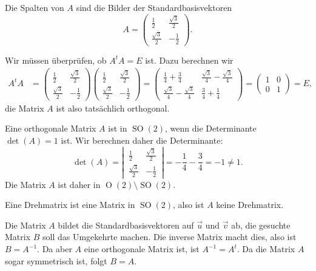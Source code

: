 \begin{loesung}
\begin{teilaufgaben}
\item Die Spalten von $A$ sind die Bilder der Standardbasisvektoren
\[
A=\begin{pmatrix}
\frac12         &\frac{\sqrt{3}}2\\
\frac{\sqrt{3}}2&-\frac12
\end{pmatrix}.
\]
\item Wir müssen überprüfen, ob $A^tA=E$ ist.
Dazu berechnen wir
\begin{align*}
A^tA
&=
\begin{pmatrix}
\frac12         &\frac{\sqrt{3}}2\\
\frac{\sqrt{3}}2&-\frac12
\end{pmatrix}
\begin{pmatrix}
\frac12         &\frac{\sqrt{3}}2\\
\frac{\sqrt{3}}2&-\frac12
\end{pmatrix}
=
\begin{pmatrix}
\frac14+\frac34&\frac{\sqrt{3}}{4}-\frac{\sqrt{3}}{4}\\
\frac{\sqrt{3}}{4}-\frac{\sqrt{3}}{4}&\frac34+\frac14
\end{pmatrix}
=
\begin{pmatrix}
1&0\\
0&1
\end{pmatrix}
=E,
\end{align*}
die Matrix $A$ ist also tatsächlich orthogonal.
\item
Eine orthogonale Matrix $A$ ist in $\operatorname{SO}(2)$, wenn die
Determinante $\det(A)=1$ ist.
Wir berechnen daher die Determinante:
\[
\det(A)
=
\left|\,\begin{matrix}
\frac12         &\frac{\sqrt{3}}2\\
\frac{\sqrt{3}}2&-\frac12
\end{matrix}\,\right|
=
-\frac14-\frac34
=
-1\ne 1.
\]
Die Matrix $A$ ist daher in $\operatorname{O}(2)\setminus\operatorname{SO}(2)$.
\item
Eine Drehmatrix ist eine Matrix in $\operatorname{SO}(2)$, also ist
$A$ keine Drehmatrix.
\item
Die Matrix $A$ bildet die Standardbasisvektoren auf $\vec u$ und $\vec v$
ab, die gesuchte Matrix $B$ soll das Umgekehrte machen.
Die inverse Matrix macht dies, also ist $B=A^{-1}$.
Da aber $A$ eine orthogonale Matrix ist, ist $A^{-1}=A^t$.
Da die Matrix $A$ sogar symmetrisch ist, folgt $B=A$.
\end{teilaufgaben}
\end{loesung}



